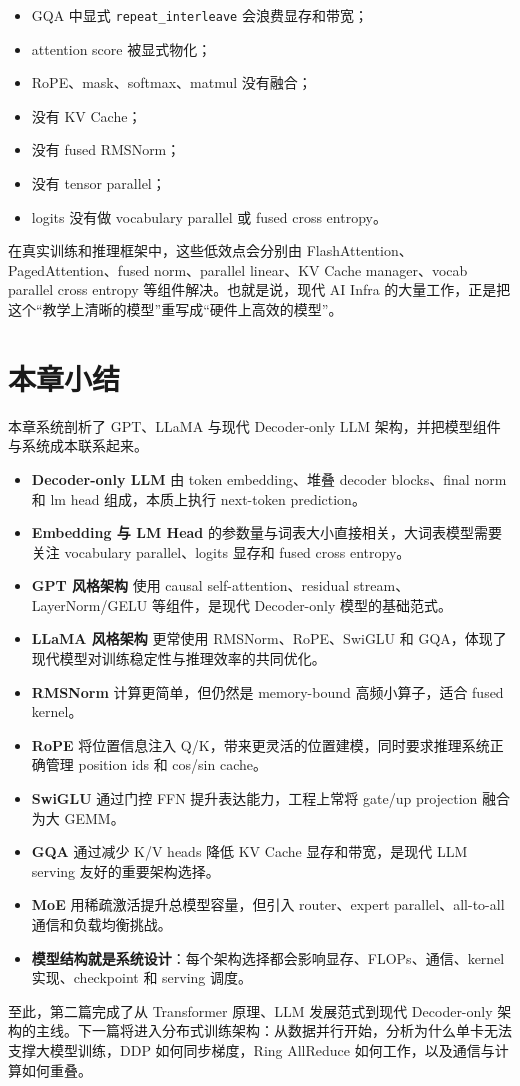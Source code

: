 \begin{itemize}
\item GQA 中显式 \texttt{repeat_interleave} 会浪费显存和带宽；
\item attention score 被显式物化；
\item RoPE、mask、softmax、matmul 没有融合；
\item 没有 KV Cache；
\item 没有 fused RMSNorm；
\item 没有 tensor parallel；
\item logits 没有做 vocabulary parallel 或 fused cross entropy。
\end{itemize}

在真实训练和推理框架中，这些低效点会分别由 FlashAttention、PagedAttention、fused norm、parallel linear、KV Cache manager、vocab parallel cross entropy 等组件解决。也就是说，现代 AI Infra 的大量工作，正是把这个“教学上清晰的模型”重写成“硬件上高效的模型”。

\section{本章小结}
\label{sec:chapter06-summary}

本章系统剖析了 GPT、LLaMA 与现代 Decoder-only LLM 架构，并把模型组件与系统成本联系起来。

\begin{itemize}
\item \textbf{Decoder-only LLM} 由 token embedding、堆叠 decoder blocks、final norm 和 lm head 组成，本质上执行 next-token prediction。
\item \textbf{Embedding 与 LM Head} 的参数量与词表大小直接相关，大词表模型需要关注 vocabulary parallel、logits 显存和 fused cross entropy。
\item \textbf{GPT 风格架构} 使用 causal self-attention、residual stream、LayerNorm/GELU 等组件，是现代 Decoder-only 模型的基础范式。
\item \textbf{LLaMA 风格架构} 更常使用 RMSNorm、RoPE、SwiGLU 和 GQA，体现了现代模型对训练稳定性与推理效率的共同优化。
\item \textbf{RMSNorm} 计算更简单，但仍然是 memory-bound 高频小算子，适合 fused kernel。
\item \textbf{RoPE} 将位置信息注入 Q/K，带来更灵活的位置建模，同时要求推理系统正确管理 position ids 和 cos/sin cache。
\item \textbf{SwiGLU} 通过门控 FFN 提升表达能力，工程上常将 gate/up projection 融合为大 GEMM。
\item \textbf{GQA} 通过减少 K/V heads 降低 KV Cache 显存和带宽，是现代 LLM serving 友好的重要架构选择。
\item \textbf{MoE} 用稀疏激活提升总模型容量，但引入 router、expert parallel、all-to-all 通信和负载均衡挑战。
\item \textbf{模型结构就是系统设计}：每个架构选择都会影响显存、FLOPs、通信、kernel 实现、checkpoint 和 serving 调度。
\end{itemize}

至此，第二篇完成了从 Transformer 原理、LLM 发展范式到现代 Decoder-only 架构的主线。下一篇将进入分布式训练架构：从数据并行开始，分析为什么单卡无法支撑大模型训练，DDP 如何同步梯度，Ring AllReduce 如何工作，以及通信与计算如何重叠。
